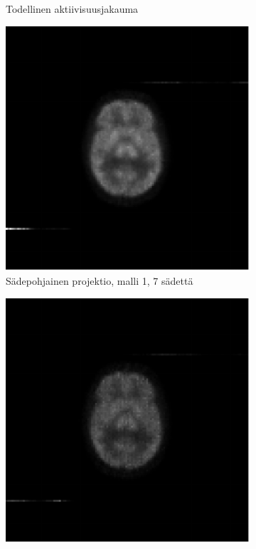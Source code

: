 \begin{figure}[H]
\begin{subfigure}[t]{.25\textwidth}
        \caption{Todellinen aktiivisuusjakauma}
    \end{subfigure}%
    \hspace{.075\textwidth}%
    \begin{subfigure}[t]{.25\textwidth}
        \includegraphics[width=\linewidth]{kuvat/cbf_rekonstruktio_proj1_malli1_nRay7.pdf}
        \caption{Sädepohjainen projektio, malli 1, 7 sädettä}
    \end{subfigure}
    \begin{subfigure}[b]{.25\textwidth}
        \includegraphics[width=\linewidth]{kuvat/cbf_rekonstruktio_proj1_malli2_nRay7.pdf}

\end{subfigure}
\end{figure}
